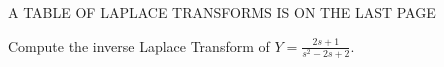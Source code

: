 \documentclass[12pt]{exam}
\begin{document}
    
    


\vspace{1cm}
\begin{center}
    A TABLE OF LAPLACE TRANSFORMS IS ON THE LAST PAGE
\end{center}

\newpage \InitialsRight


\begin{questions}
        
        
        
        
    \question[5] Compute the inverse Laplace Transform of  $\displaystyle Y = \frac{2s+1}{s^2-2s+2}$. %
    
    
    
        
\newpage %
    
    

\end{questions}
\end{document}
